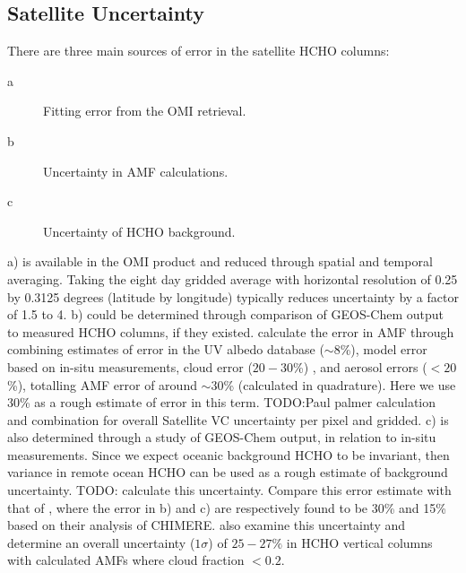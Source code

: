   \subsection{Satellite Uncertainty}
    \label{BioIsop:Uncertianty:Satellite}
    
    There are three main sources of error in the satellite HCHO columns:
    \begin{description}
      \item[a] Fitting error from the OMI retrieval.
      \item[b] Uncertainty in AMF calculations.
      \item[c] Uncertainty of HCHO background.
    \end{description}
    a) is available in the OMI product and reduced through spatial and temporal averaging.
    Taking the eight day gridded average with horizontal resolution of 0.25 by 0.3125 degrees (latitude by longitude) typically reduces uncertainty by a factor of 1.5 to 4.
    b) could be determined through comparison of GEOS-Chem output to measured HCHO columns, if they existed.
    \textcite{Palmer2006} calculate the error in AMF through combining estimates of error in the UV albedo database ($\sim 8$\%), model error based on in-situ measurements, cloud error  ($20-30$\%) \parencite{Martin2003}, and aerosol errors ($<20$\%), totalling AMF error of around $\sim 30$\% (calculated in quadrature).
    Here we use 30\% as a rough estimate of error in this term.
    TODO:Paul palmer calculation and combination for overall Satellite VC uncertainty per pixel and gridded.
    c) is also determined through a study of GEOS-Chem output, in relation to in-situ measurements. 
    Since we expect oceanic background HCHO to be invariant, then variance in remote ocean HCHO can be used as a rough estimate of background uncertainty.
    TODO: calculate this uncertainty.
    Compare this error estimate with that of \textcite{Curci2010}, where the error in b) and c) are respectively found to be 30\% and 15\% based on their analysis of CHIMERE.
    \textcite{Millet2008} also examine this uncertainty and determine an overall uncertainty ($1\sigma$) of $25-27\%$ in HCHO vertical columns with calculated AMFs where cloud fraction $< 0.2$.
    
